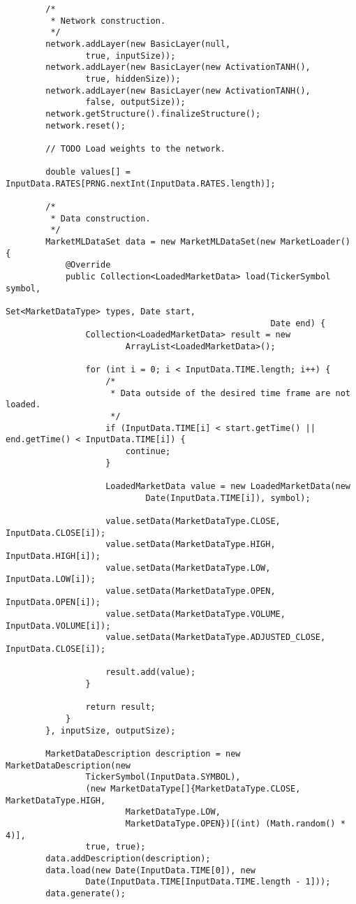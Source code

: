 \begin{verbatim}
        /*
         * Network construction.
         */
        network.addLayer(new BasicLayer(null,
                true, inputSize));
        network.addLayer(new BasicLayer(new ActivationTANH(),
                true, hiddenSize));
        network.addLayer(new BasicLayer(new ActivationTANH(),
                false, outputSize));
        network.getStructure().finalizeStructure();
        network.reset();

        // TODO Load weights to the network.

        double values[] = InputData.RATES[PRNG.nextInt(InputData.RATES.length)];

        /*
         * Data construction.
         */
        MarketMLDataSet data = new MarketMLDataSet(new MarketLoader() {
            @Override
            public Collection<LoadedMarketData> load(TickerSymbol symbol,
                                                     Set<MarketDataType> types, Date start,
                                                     Date end) {
                Collection<LoadedMarketData> result = new
                        ArrayList<LoadedMarketData>();

                for (int i = 0; i < InputData.TIME.length; i++) {
                    /*
                     * Data outside of the desired time frame are not loaded.
                     */
                    if (InputData.TIME[i] < start.getTime() || end.getTime() < InputData.TIME[i]) {
                        continue;
                    }

                    LoadedMarketData value = new LoadedMarketData(new
                            Date(InputData.TIME[i]), symbol);

                    value.setData(MarketDataType.CLOSE, InputData.CLOSE[i]);
                    value.setData(MarketDataType.HIGH, InputData.HIGH[i]);
                    value.setData(MarketDataType.LOW, InputData.LOW[i]);
                    value.setData(MarketDataType.OPEN, InputData.OPEN[i]);
                    value.setData(MarketDataType.VOLUME, InputData.VOLUME[i]);
                    value.setData(MarketDataType.ADJUSTED_CLOSE, InputData.CLOSE[i]);

                    result.add(value);
                }

                return result;
            }
        }, inputSize, outputSize);

        MarketDataDescription description = new MarketDataDescription(new
                TickerSymbol(InputData.SYMBOL),
                (new MarketDataType[]{MarketDataType.CLOSE, MarketDataType.HIGH,
                        MarketDataType.LOW,
                        MarketDataType.OPEN})[(int) (Math.random() * 4)],
                true, true);
        data.addDescription(description);
        data.load(new Date(InputData.TIME[0]), new
                Date(InputData.TIME[InputData.TIME.length - 1]));
        data.generate();


\end{verbatim}
